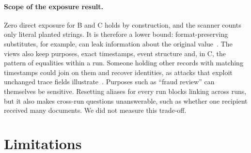 \documentclass[11pt]{article}
\begin{document}
\paragraph{Scope of the exposure result.} Zero direct exposure for B and C holds by construction, and the scanner counts only literal planted strings. It is therefore a lower bound: format-preserving substitutes, for example, can leak information about the original value~\cite{boesgaard2026fpe}. The views also keep purposes, exact timestamps, event structure and, in C, the pattern of equalities within a run. Someone holding other records with matching timestamps could join on them and recover identities, as attacks that exploit unchanged trace fields illustrate~\cite{mohammady2018multiview,coull2007devil}. Purposes such as ``fraud review'' can themselves be sensitive. Resetting aliases for every run blocks linking across runs, but it also makes cross-run questions unanswerable, such as whether one recipient received many documents. We did not measure this trade-off.

\section{Limitations}
\end{document}
